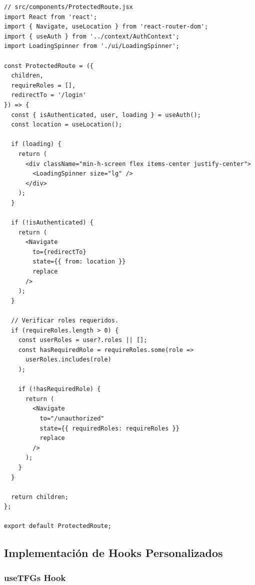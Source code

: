 \documentclass[12pt,a4paper,oneside]{report}
\begin{document}
\begin{lstlisting}
// src/components/ProtectedRoute.jsx
import React from 'react';
import { Navigate, useLocation } from 'react-router-dom';
import { useAuth } from '../context/AuthContext';
import LoadingSpinner from './ui/LoadingSpinner';

const ProtectedRoute = ({ 
  children, 
  requireRoles = [],
  redirectTo = '/login' 
}) => {
  const { isAuthenticated, user, loading } = useAuth();
  const location = useLocation();

  if (loading) {
    return (
      <div className="min-h-screen flex items-center justify-center">
        <LoadingSpinner size="lg" />
      </div>
    );
  }

  if (!isAuthenticated) {
    return (
      <Navigate 
        to={redirectTo} 
        state={{ from: location }} 
        replace 
      />
    );
  }

  // Verificar roles requeridos.
  if (requireRoles.length > 0) {
    const userRoles = user?.roles || [];
    const hasRequiredRole = requireRoles.some(role => 
      userRoles.includes(role)
    );

    if (!hasRequiredRole) {
      return (
        <Navigate 
          to="/unauthorized" 
          state={{ requiredRoles: requireRoles }} 
          replace 
        />
      );
    }
  }

  return children;
};

export default ProtectedRoute;
\end{lstlisting}

\subsection{Implementación de Hooks
Personalizados}\label{implementaciuxf3n-de-hooks-personalizados}

\subsubsection{useTFGs Hook}\label{usetfgs-hook}
\end{document}
